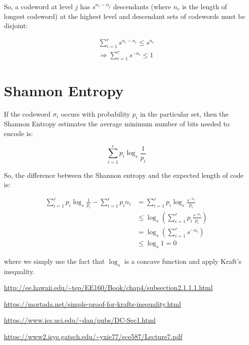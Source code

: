 \documentclass[11pt]{article}
\begin{document}
So, a codeword at level $j$ has $s^{n_{r}-n_{j}}$ descendants (where $n_{r}$ is the length of longest codeword) at the highest level and descendant sets of codewords must be disjoint:

\begin{equation} \label{eq1}
\begin{split}
\sum_{i=1}^r s^{n_r - n_i} \leq s^{n_r} \\
 \Rightarrow \sum_{i=1}^{r} s^{-n_{i}} \leq 1
\end{split}
\end{equation}

\section{Shannon Entropy}

If the codeword $\sigma_{i}$ occurs with probability $p_{i}$ in the particular set, then the Shannon Entropy estimates the average minimum number of bits needed to encode is:

\begin{equation}
\sum_{i=1}^r p_{i}\log_{s}\frac{1}{p_{i}}
\end{equation}

So, the difference between the Shannon entropy and the expected length of code is:

\begin{equation} \label{eq1}
\begin{split}
\sum_{i=1}^r p_{i}\log_{s}\frac{1}{p_{i}} - \sum_{i=1}^r p_{i}n_{i} &= \sum_{i=1}^r p_{i}\log_{s} \frac{s^{-n_{i}}}{p_{i}} \\
 & \leq \log_{s}(\sum_{i=1}^r p_{i} \frac{s^{-n_{i}}}{p_{i}}) \\
 & = \log_{s} (\sum_{i=1}^r s^{-n_{i}}) \\
 & \leq \log_{s} 1 = 0
\end{split}
\end{equation}

where we simply use the fact that $\log_{s}$ is a concave function and apply Kraft's inequality.

\begin{thebibliography}{99}

\url{http://ee.hawaii.edu/~tep/EE160/Book/chap4/subsection2.1.1.1.html}

\url{https://mortada.net/simple-proof-for-krafts-inequality.html}

\url{https://www.ics.uci.edu/~dan/pubs/DC-Sec1.html}

\url{https://www2.isye.gatech.edu/~yxie77/ece587/Lecture7.pdf}

\end{thebibliography}
\end{document}

